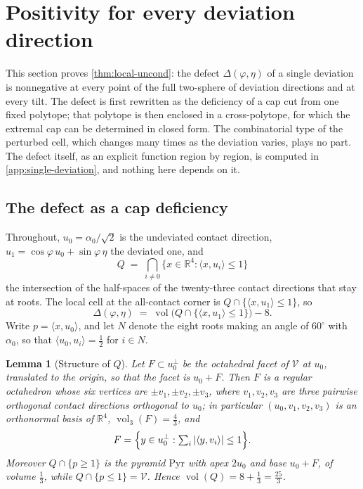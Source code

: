 \documentclass[11pt,reqno]{amsart}
\renewcommand{\_}{\origunderscore\allowbreak}
\numberwithin{equation}{section}
\theoremstyle{plain}
\newtheorem{lem}[thm]{Lemma}
\theoremstyle{definition}
\theoremstyle{remark}
\newcommand{\VCell}{\mathcal{V}}             %
\newcommand{\tilt}{\varphi}                  %
\newcommand{\dev}{\eta}                      %
\newcommand{\defect}{\Delta}                 %
\newcommand{\base}{u}                        %
\DeclareMathOperator{\vol}{vol}
\begin{document}
\section{Positivity for every deviation direction}\label{sec:cap-theorem}

This section proves \cref{thm:local-uncond}: the defect
$\defect(\tilt,\dev)$ of a single deviation is nonnegative at every point
of the full two-sphere of deviation directions and at every tilt. The defect is first rewritten as
the deficiency of a cap cut from one fixed polytope; that polytope is then
enclosed in a cross-polytope, for which the extremal cap can be determined
in closed form. The combinatorial type of the perturbed cell, which
changes many times as the deviation varies, plays no part. The defect
itself, as an explicit function region by region, is computed in
\cref{app:single-deviation}, and nothing here depends on it.

\subsection{The defect as a cap deficiency}\label{sec:cap-reformulation}

Throughout, $\base_0=\alpha_0/\sqrt2$ is the undeviated contact direction,
$\base_1=\cos\tilt\,\base_0+\sin\tilt\,\dev$ the deviated one, and
\[
  Q \;=\; \bigcap_{i\ne0}\bigl\{x\in\mathbb{R}^4 :
          \langle x,\base_i\rangle\le1\bigr\}
\]
the intersection of the half-spaces of the twenty-three contact directions
that stay at roots. The local cell at the all-contact corner is
$Q\cap\{\langle x,\base_1\rangle\le1\}$, so
\begin{equation}\label{eq:defect-is-vol}
  \defect(\tilt,\dev)
  \;=\;\vol\bigl(Q\cap\{\langle x,\base_1\rangle\le1\}\bigr)-8 .
\end{equation}
Write $p=\langle x,\base_0\rangle$, and let $N$ denote the eight roots
making an angle of $60^\circ$ with $\alpha_0$, so that
$\langle\base_0,\base_i\rangle=\tfrac12$ for $i\in N$.

\begin{lem}[Structure of $Q$]\label{lem:Q-structure}
Let $F\subset\base_0^{\perp}$ be the octahedral facet of $\VCell$ at
$\base_0$, translated to the origin, so that the facet is $\base_0+F$.
Then $F$ is a regular octahedron whose six vertices are $\pm v_1,\pm
v_2,\pm v_3$, where $v_1,v_2,v_3$ are three pairwise orthogonal contact
directions orthogonal to $\base_0$; in particular
$(\base_0,v_1,v_2,v_3)$ is an orthonormal basis of $\mathbb{R}^4$,
$\vol_3(F)=\tfrac43$, and
\[
  F=\Bigl\{y\in\base_0^{\perp} : \textstyle\sum_{i}|\langle y,v_i\rangle|\le1\Bigr\} .
\]
Moreover $Q\cap\{p\ge1\}$ is the pyramid $\mathrm{Pyr}$ with apex
$2\base_0$ and base $\base_0+F$, of volume $\tfrac13$, while
$Q\cap\{p\le1\}=\VCell$. Hence $\vol(Q)=8+\tfrac13=\tfrac{25}{3}$.
\end{lem}
\end{document}
